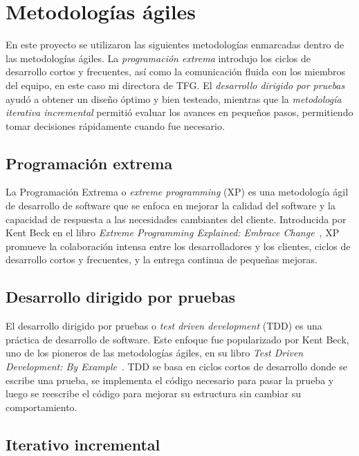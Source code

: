 \section{Metodologías ágiles}

En este proyecto se utilizaron las siguientes metodologías enmarcadas dentro de las metodologías ágiles.
La \textit{programación extrema} introdujo los ciclos de desarrollo cortos y frecuentes, así como la comunicación
fluida con los miembros del equipo, en este caso mi directora de TFG.
El \textit{desarrollo dirigido por pruebas} ayudó a obtener un diseño óptimo y bien testeado, mientras que la
\textit{metodología iterativa incremental} permitió evaluar los avances en pequeños pasos, permitiendo tomar
decisiones rápidamente cuando fue necesario.

\subsection*{Programación extrema}

La Programación Extrema o \textit{extreme programming} (XP) es una metodología ágil de desarrollo de software que se
enfoca en mejorar la calidad del software y la capacidad de respuesta a las necesidades cambiantes del cliente.
Introducida por Kent Beck en el libro \textit{Extreme Programming Explained: Embrace Change}~\cite{book_beck_1999},
XP promueve la colaboración intensa entre los desarrolladores y los clientes, ciclos de desarrollo cortos y frecuentes,
y la entrega continua de pequeñas mejoras.

\subsection*{Desarrollo dirigido por pruebas}

El desarrollo dirigido por pruebas o \textit{test driven development} (TDD) es una práctica de desarrollo de software.
Este enfoque fue popularizado por Kent Beck, uno de los pioneros de las metodologías ágiles, en su libro
\textit{Test Driven Development: By Example}~\cite{book_beck_2003}.
TDD se basa en ciclos cortos de desarrollo donde se escribe una prueba, se implementa el código necesario para pasar la
prueba y luego se reescribe el código para mejorar su estructura sin cambiar su comportamiento.

\subsection*{Iterativo incremental}\label{subsec:iterativo_incremental}

